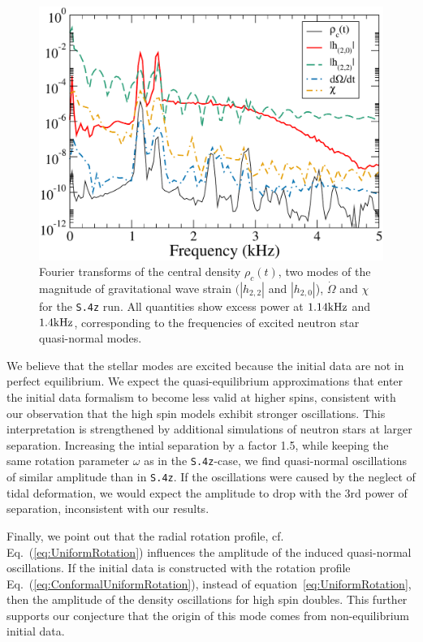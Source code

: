 {\begin{figure}
\includegraphics[width=0.95\columnwidth]{chap2/ManyQuantities}
\caption[Fourier transforms of several different quantities in the {\tt S.4z} run.]{\label{fig:ManyQuantities} Fourier transforms of the central
  density $\rho_c(t)$, two modes of the magnitude of gravitational wave strain
  $(|h_{2,2}|$ and $|h_{2,0}|$), $\dot{\Omega}$ and $\chi$ for the {\tt S.4z}
  run.  All quantities show excess power at $1.14\rm{kHz}$ and
  $1.4\rm{kHz}$, corresponding to the frequencies of excited neutron
  star quasi-normal modes. 
}
\end{figure}



We believe  that the  stellar  modes are  excited because  the
  initial  data  are  not  in  perfect  equilibrium.   We  expect  the
  quasi-equilibrium  approximations   that  enter  the   initial  data
  formalism to become less valid  at higher spins, consistent with our
  observation that the high spin models exhibit stronger oscillations.
  This  interpretation is  strengthened by  additional simulations  of
  neutron stars at larger separation. Increasing   the  intial
  separation  by  a  factor  1.5,  while  keeping  the  same  rotation
  parameter  $\omega$  as  in  the  {\tt S.4z}-case,  we  find  quasi-normal
  oscillations   of  similar   amplitude  than   in  {\tt S.4z}.    If  the
  oscillations were  caused by  the neglect  of tidal  deformation, we
  would expect the amplitude to drop with the 3rd power of separation,
  inconsistent with our results. 


  Finally, we point out that the radial rotation profile,
  cf. Eq.~(\ref{eq:UniformRotation}) influences the amplitude of the
  induced quasi-normal oscillations.  If the initial data is
  constructed with the rotation profile
  Eq.~(\ref{eq:ConformalUniformRotation}), instead of
  equation~\ref{eq:UniformRotation}, then the amplitude of the density oscillations for
  high spin doubles. This further supports our conjecture that the
  origin of this mode comes from non-equilibrium initial data.


}
